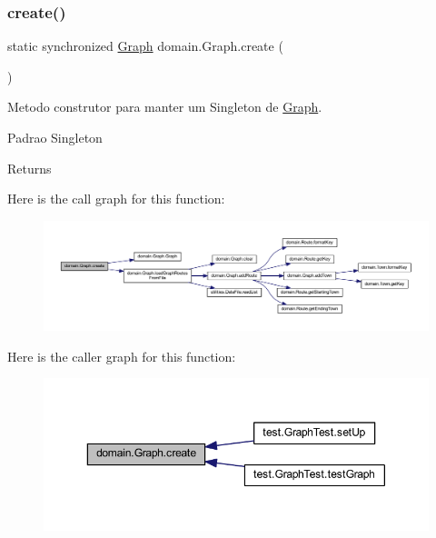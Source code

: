 \subsubsection{\texorpdfstring{create()}{create()}}
{\footnotesize\ttfamily static synchronized \hyperlink{classdomain_1_1_graph}{Graph} domain.\+Graph.\+create (\begin{DoxyParamCaption}{ }\end{DoxyParamCaption})\hspace{0.3cm}{\ttfamily [static]}}

Metodo construtor para manter um Singleton de \hyperlink{classdomain_1_1_graph}{Graph}.

Padrao Singleton \begin{DoxyReturn}{Returns}

\end{DoxyReturn}
Here is the call graph for this function\+:\nopagebreak
\begin{figure}[H]
\begin{center}
\leavevmode
\includegraphics[width=350pt]{classdomain_1_1_graph_a57ce4efd344c059a565f4bb104fdee64_cgraph}
\end{center}
\end{figure}
Here is the caller graph for this function\+:\nopagebreak
\begin{figure}[H]
\begin{center}
\leavevmode
\includegraphics[width=350pt]{classdomain_1_1_graph_a57ce4efd344c059a565f4bb104fdee64_icgraph}
\end{center}
\end{figure}
\mbox{\label{classdomain_1_1_graph_a3ceedf597c66f500579a0e302c32062b}} 
